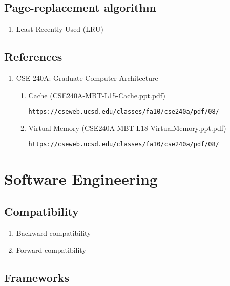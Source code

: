 \documentclass[12pt,a4paper]{article}
\begin{document}
\subsection{Page-replacement algorithm}

\begin{enumerate}

\item Least Recently Used (LRU)

\end{enumerate}

\subsection{References}

\begin{enumerate}

\item CSE 240A: Graduate Computer Architecture

	\begin{enumerate}

	\item Cache (CSE240A-MBT-L15-Cache.ppt.pdf)

	\texttt{https://cseweb.ucsd.edu/classes/fa10/cse240a/pdf/08/}

	\item Virtual Memory (CSE240A-MBT-L18-VirtualMemory.ppt.pdf)

	\texttt{https://cseweb.ucsd.edu/classes/fa10/cse240a/pdf/08/}

	\end{enumerate}

\end{enumerate}

\section{Software Engineering}

\subsection{Compatibility}

\begin{enumerate}
\item Backward compatibility
\item Forward compatibility
\end{enumerate}

\subsection{Frameworks}
\end{document}
